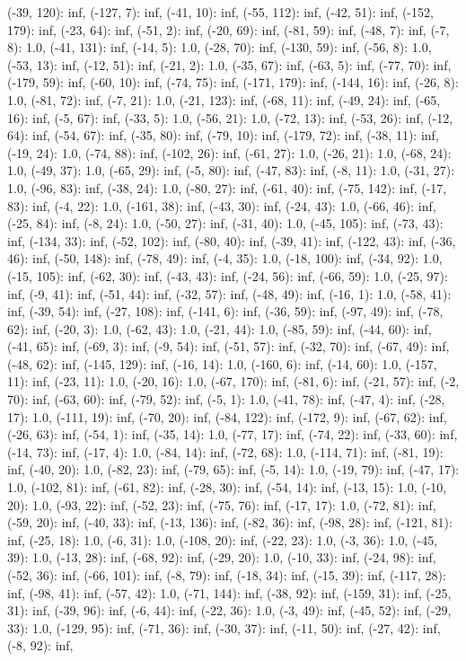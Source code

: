 \documentclass[parskip=half]{scrartcl}
\begin{document}
(-39, 120): inf, (-127, 7): inf, (-41, 10): inf, (-55, 112): inf, (-42, 51): inf, (-152, 179): inf, (-23, 64): inf, (-51, 2): inf, (-20, 69): inf, (-81, 59): inf, (-48, 7): inf, (-7, 8): 1.0, (-41, 131): inf, (-14, 5): 1.0, (-28, 70): inf, (-130, 59): inf, (-56, 8): 1.0, (-53, 13): inf, (-12, 51): inf, (-21, 2): 1.0, (-35, 67): inf, (-63, 5): inf, (-77, 70): inf, (-179, 59): inf, (-60, 10): inf, (-74, 75): inf, (-171, 179): inf, (-144, 16): inf, (-26, 8): 1.0, (-81, 72): inf, (-7, 21): 1.0, (-21, 123): inf, (-68, 11): inf, (-49, 24): inf, (-65, 16): inf, (-5, 67): inf, (-33, 5): 1.0, (-56, 21): 1.0, (-72, 13): inf, (-53, 26): inf, (-12, 64): inf, (-54, 67): inf, (-35, 80): inf, (-79, 10): inf, (-179, 72): inf, (-38, 11): inf, (-19, 24): 1.0, (-74, 88): inf, (-102, 26): inf, (-61, 27): 1.0, (-26, 21): 1.0, (-68, 24): 1.0, (-49, 37): 1.0, (-65, 29): inf, (-5, 80): inf, (-47, 83): inf, (-8, 11): 1.0, (-31, 27): 1.0, (-96, 83): inf, (-38, 24): 1.0, (-80, 27): inf, (-61, 40): inf, (-75, 142): inf, (-17, 83): inf, (-4, 22): 1.0, (-161, 38): inf, (-43, 30): inf, (-24, 43): 1.0, (-66, 46): inf, (-25, 84): inf, (-8, 24): 1.0, (-50, 27): inf, (-31, 40): 1.0, (-45, 105): inf, (-73, 43): inf, (-134, 33): inf, (-52, 102): inf, (-80, 40): inf, (-39, 41): inf, (-122, 43): inf, (-36, 46): inf, (-50, 148): inf, (-78, 49): inf, (-4, 35): 1.0, (-18, 100): inf, (-34, 92): 1.0, (-15, 105): inf, (-62, 30): inf, (-43, 43): inf, (-24, 56): inf, (-66, 59): 1.0, (-25, 97): inf, (-9, 41): inf, (-51, 44): inf, (-32, 57): inf, (-48, 49): inf, (-16, 1): 1.0, (-58, 41): inf, (-39, 54): inf, (-27, 108): inf, (-141, 6): inf, (-36, 59): inf, (-97, 49): inf, (-78, 62): inf, (-20, 3): 1.0, (-62, 43): 1.0, (-21, 44): 1.0, (-85, 59): inf, (-44, 60): inf, (-41, 65): inf, (-69, 3): inf, (-9, 54): inf, (-51, 57): inf, (-32, 70): inf, (-67, 49): inf, (-48, 62): inf, (-145, 129): inf, (-16, 14): 1.0, (-160, 6): inf, (-14, 60): 1.0, (-157, 11): inf, (-23, 11): 1.0, (-20, 16): 1.0, (-67, 170): inf, (-81, 6): inf, (-21, 57): inf, (-2, 70): inf, (-63, 60): inf, (-79, 52): inf, (-5, 1): 1.0, (-41, 78): inf, (-47, 4): inf, (-28, 17): 1.0, (-111, 19): inf, (-70, 20): inf, (-84, 122): inf, (-172, 9): inf, (-67, 62): inf, (-26, 63): inf, (-54, 1): inf, (-35, 14): 1.0, (-77, 17): inf, (-74, 22): inf, (-33, 60): inf, (-14, 73): inf, (-17, 4): 1.0, (-84, 14): inf, (-72, 68): 1.0, (-114, 71): inf, (-81, 19): inf, (-40, 20): 1.0, (-82, 23): inf, (-79, 65): inf, (-5, 14): 1.0, (-19, 79): inf, (-47, 17): 1.0, (-102, 81): inf, (-61, 82): inf, (-28, 30): inf, (-54, 14): inf, (-13, 15): 1.0, (-10, 20): 1.0, (-93, 22): inf, (-52, 23): inf, (-75, 76): inf, (-17, 17): 1.0, (-72, 81): inf, (-59, 20): inf, (-40, 33): inf, (-13, 136): inf, (-82, 36): inf, (-98, 28): inf, (-121, 81): inf, (-25, 18): 1.0, (-6, 31): 1.0, (-108, 20): inf, (-22, 23): 1.0, (-3, 36): 1.0, (-45, 39): 1.0, (-13, 28): inf, (-68, 92): inf, (-29, 20): 1.0, (-10, 33): inf, (-24, 98): inf, (-52, 36): inf, (-66, 101): inf, (-8, 79): inf, (-18, 34): inf, (-15, 39): inf, (-117, 28): inf, (-98, 41): inf, (-57, 42): 1.0, (-71, 144): inf, (-38, 92): inf, (-159, 31): inf, (-25, 31): inf, (-39, 96): inf, (-6, 44): inf, (-22, 36): 1.0, (-3, 49): inf, (-45, 52): inf, (-29, 33): 1.0, (-129, 95): inf, (-71, 36): inf, (-30, 37): inf, (-11, 50): inf, (-27, 42): inf, (-8, 92): inf, 
\end{document}
